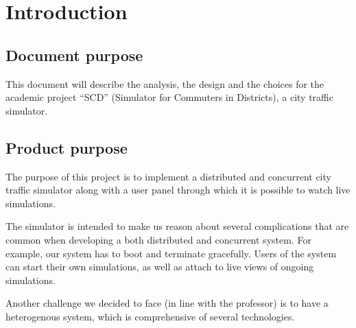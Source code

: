 \section{Introduction}
\subsection{Document purpose}
This document will describe the analysis, the design and the choices for the
academic project ``SCD'' (Simulator for Commuters in Districts), a city traffic
simulator.

\subsection{Product purpose}\label{productPurpose}
The purpose of this project is to implement a distributed and concurrent city
traffic simulator along with a user panel through which it is possible to
watch live simulations.

The simulator is intended to make us reason about several complications that
are common when developing a both distributed and concurrent system. For
example, our system has to boot and terminate gracefully.
Users of the system can start their own simulations, as well as attach to live
views of ongoing simulations.

Another challenge we decided to face (in line with the professor) is to have
a heterogenous system, which is comprehensive of several technologies.
